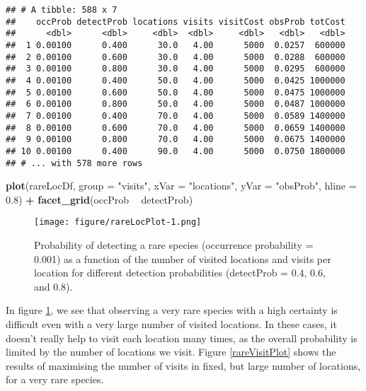 \documentclass[]{article}
\newenvironment{Shaded}{\begin{snugshade}}{\end{snugshade}}
\newcommand{\KeywordTok}[1]{\textcolor[rgb]{0.13,0.29,0.53}{\textbf{#1}}}
\newcommand{\DataTypeTok}[1]{\textcolor[rgb]{0.13,0.29,0.53}{#1}}
\newcommand{\FloatTok}[1]{\textcolor[rgb]{0.00,0.00,0.81}{#1}}
\newcommand{\StringTok}[1]{\textcolor[rgb]{0.31,0.60,0.02}{#1}}
\newcommand{\OperatorTok}[1]{\textcolor[rgb]{0.81,0.36,0.00}{\textbf{#1}}}
\newcommand{\NormalTok}[1]{#1}
\begin{document}
\begin{verbatim}
## # A tibble: 588 x 7
##    occProb detectProb locations visits visitCost obsProb totCost
##      <dbl>      <dbl>     <dbl>  <dbl>     <dbl>   <dbl>   <dbl>
##  1 0.00100      0.400      30.0   4.00      5000  0.0257  600000
##  2 0.00100      0.600      30.0   4.00      5000  0.0288  600000
##  3 0.00100      0.800      30.0   4.00      5000  0.0295  600000
##  4 0.00100      0.400      50.0   4.00      5000  0.0425 1000000
##  5 0.00100      0.600      50.0   4.00      5000  0.0475 1000000
##  6 0.00100      0.800      50.0   4.00      5000  0.0487 1000000
##  7 0.00100      0.400      70.0   4.00      5000  0.0589 1400000
##  8 0.00100      0.600      70.0   4.00      5000  0.0659 1400000
##  9 0.00100      0.800      70.0   4.00      5000  0.0675 1400000
## 10 0.00100      0.400      90.0   4.00      5000  0.0750 1800000
## # ... with 578 more rows
\end{verbatim}

\begin{Shaded}
\begin{Highlighting}[]
\KeywordTok{plot}\NormalTok{(rareLocDf, }\DataTypeTok{group =} \StringTok{"visits"}\NormalTok{, }\DataTypeTok{xVar =} \StringTok{"locations"}\NormalTok{, }\DataTypeTok{yVar =} \StringTok{"obsProb"}\NormalTok{, }\DataTypeTok{hline =} \FloatTok{0.8}\NormalTok{) }\OperatorTok{+}\StringTok{ }
\StringTok{    }\KeywordTok{facet_grid}\NormalTok{(occProb }\OperatorTok{~}\StringTok{ }\NormalTok{detectProb)}
\end{Highlighting}
\end{Shaded}

\begin{figure}
\centering
\texttt{[image: figure/rareLocPlot-1.png]}
\caption{Probability of detecting a rare species (occurrence probability
= 0.001) as a function of the number of visited locations and visits per
location for different detection probabilities (detectProb = 0.4, 0.6,
and 0.8). \label{rareLocPlot}}
\end{figure}

In figure \ref{rareLocPlot}, we see that observing a very rare species
with a high certainty is difficult even with a very large number of
visited locations. In these cases, it doesn't really help to visit each
location many times, as the overall probability is limited by the number
of locations we visit. Figure \ref{rareVisitPlot} shows the results of
maximising the number of visits in fixed, but large number of locations,
for a very rare species.
\end{document}
